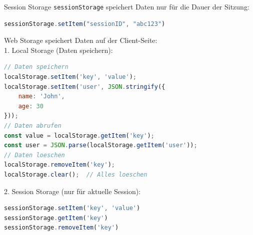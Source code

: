 \begin{definition}{Session Storage}
\texttt{sessionStorage} speichert Daten nur für die Dauer der Sitzung:
\begin{lstlisting}[language=JavaScript, style=basesmol]
sessionStorage.setItem("sessionID", "abc123")
\end{lstlisting}
\end{definition}

\begin{KR}{Web Storage} speichert Daten auf der Client-Seite:\\
1. Local Storage (Daten speichern):
\begin{lstlisting}[language=JavaScript, style=basesmol]
// Daten speichern
localStorage.setItem('key', 'value');
localStorage.setItem('user', JSON.stringify({
    name: 'John',
    age: 30
}));
// Daten abrufen
const value = localStorage.getItem('key');
const user = JSON.parse(localStorage.getItem('user'));
// Daten loeschen
localStorage.removeItem('key');
localStorage.clear();  // Alles loeschen
\end{lstlisting}

2. Session Storage (nur für aktuelle Session):
\begin{lstlisting}[language=JavaScript, style=basesmol]
sessionStorage.setItem('key', 'value')
sessionStorage.getItem('key')
sessionStorage.removeItem('key')
\end{lstlisting}
\end{KR}


